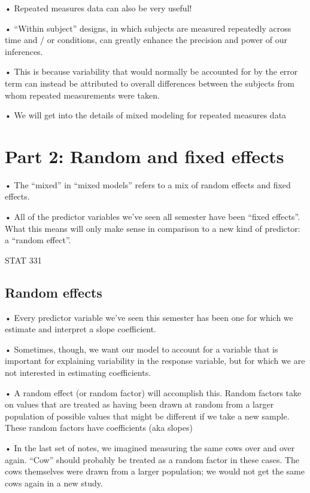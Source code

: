 \documentclass[
  letterpaper,
  DIV=11,
  numbers=noendperiod]{scrreprt}
\begin{document}
• Repeated measures data can also be very useful!

• ``Within subject'' designs, in which subjects are measured repeatedly
across time and / or conditions, can greatly enhance the precision and
power of our inferences.

• This is because variability that would normally be accounted for by
the error term can instead be attributed to overall differences between
the subjects from whom repeated measurements were taken.

• We will get into the details of mixed modeling for repeated measures
data

\hypertarget{part-2-random-and-fixed-effects}{%
\section{Part 2: Random and fixed
effects}\label{part-2-random-and-fixed-effects}}

• The ``mixed'' in ``mixed models'' refers to a mix of random effects
and fixed effects.

• All of the predictor variables we've seen all semester have been
``fixed effects''. What this means will only make sense in comparison to
a new kind of predictor: a ``random effect''.

STAT 331

\hypertarget{random-effects}{%
\subsection{Random effects}\label{random-effects}}

• Every predictor variable we've seen this semester has been one for
which we estimate and interpret a slope coefficient.

• Sometimes, though, we want our model to account for a variable that is
important for explaining variability in the response variable, but for
which we are not interested in estimating coefficients.

• A random effect (or random factor) will accomplish this. Random
factors take on values that are treated as having been drawn at random
from a larger population of possible values that might be different if
we take a new sample. These random factors have coefficients (aka
slopes)

• In the last set of notes, we imagined measuring the same cows over and
over again. ``Cow'' should probably be treated as a random factor in
these cases. The cows themselves were drawn from a larger population; we
would not get the same cows again in a new study.
\end{document}
